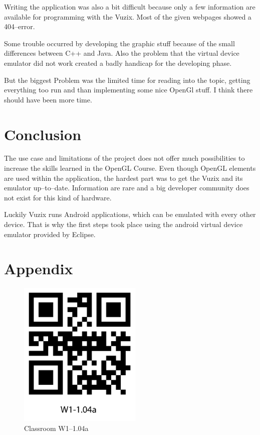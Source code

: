 \documentclass[11pt]{scrartcl}
\begin{document}
\begin{multicols}{2}
			Writing the application was also a bit difficult because only a few information are available for programming with the Vuzix. Most of the given webpages showed a 404--error.
			 
			 Some trouble occurred by developing the graphic stuff because of the small differences between C++ and Java. Also the problem that the virtual device emulator did not work created a badly handicap for the developing phase.
			 
			 But the biggest Problem was the limited time for reading into the topic, getting everything too run and than implementing some nice OpenGl stuff. I think there should have been more time.
			
	\section{Conclusion}
		The use case and limitations of the project does not offer much possibilities to increase the skills learned in the OpenGL Course. Even though OpenGL elements are used within the application, the hardest part was to get the Vuzix and its emulator up--to--date. Information are rare and a big developer community does not exist for this kind of hardware.
		
		Luckily Vuzix runs Android applications, which can be emulated with every other device. That is why the first steps took place using the android virtual device emulator provided by Eclipse.
\end{multicols}




\pagebreak
\section*{Appendix}
	\begin{figure}[htpb]
		\centering
		\includegraphics[height=7cm]{figure/qrcode_W1-104a}
		\caption{Classroom W1--1.04a\label{qrCodeW1-1.04a}}
	\end{figure}
	
\end{document}
